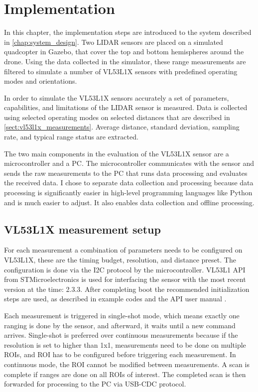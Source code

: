 \chapter{Implementation} \label{chap:implementation}
In this chapter, the implementation steps are introduced to the system described in
\ref{chap:system_design}. Two LIDAR sensors are placed on a simulated quadcopter in Gazebo,
that cover the top and bottom hemispheres around the drone. Using the data collected in the
simulator, these range measurements are filtered to simulate a number of VL53L1X sensors with
predefined operating modes and orientations.

In order to simulate the VL53L1X sensors accurately a set of parameters, capabilities, and
limitations of the LIDAR sensor is measured. Data is collected using selected operating modes
on selected distances that are described in \ref{sect:vl53l1x_measurements}. Average distance,
standard deviation, sampling rate, and typical range status are extracted.

The two main components in the evaluation of the VL53L1X sensor are a microcontroller and a PC. The
microcontroller communicates with the sensor and sends the raw measurements to the PC that runs
data processing and evaluates the received data. I chose to separate data collection and processing
because data processing is significantly easier in high-level programming languages like Python and
is much easier to adjust. It also enables data collection and offline processing.


\section{VL53L1X measurement setup}
For each measurement a combination of parameters needs to be configured on VL53L1X, these are the
timing budget, resolution, and distance preset. The configuration is done via the I2C protocol by the
microcontroller. VL53L1 API from STMicroelectronics is used for interfacing the sensor with the most
recent version at the time: 2.3.3. After completing boot the recommended initialization steps are
used, as described in example codes and the API user manual \cite{VL53L1XAPIManual}.

Each measurement is triggered in single-shot mode, which means exactly one ranging is done by the
sensor, and afterward, it waits until a new command arrives.  Single-shot is preferred over continuous
measurements because if the resolution is set to higher than 1x1, measurements need to be done on
multiple ROIs, and ROI has to be configured before triggering each measurement. In continuous mode,
the ROI cannot be modified between measurements.
A scan is complete if ranges are done on all ROIs of interest. The completed scan is then forwarded
for processing to the PC via USB-CDC protocol.

